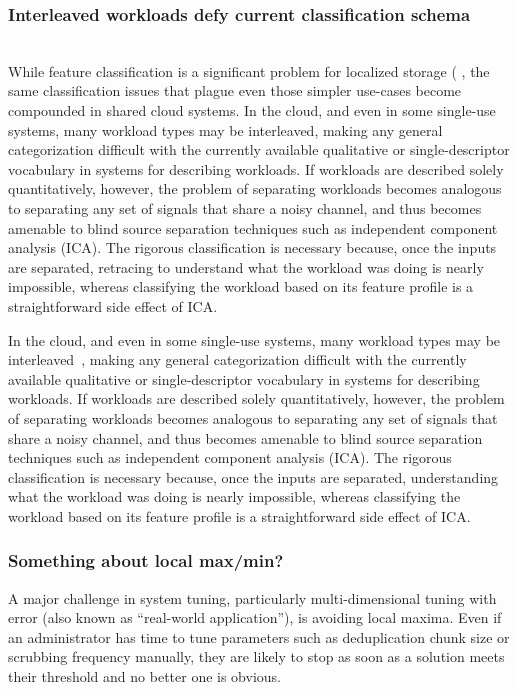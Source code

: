 \subsubsection*{Interleaved workloads defy current classification schema}\\
While feature classification is a significant problem for localized storage (%
, the
same classification issues that plague even those simpler use-cases become
compounded in shared cloud systems. In the cloud, and even in some single-use systems, many workload types may be interleaved, making any general
categorization difficult with the currently available qualitative or
single-descriptor vocabulary in systems for describing workloads.  If workloads
are described solely quantitatively, however, the problem of separating
workloads becomes analogous to separating any set of signals that share a noisy
channel, and thus becomes amenable to blind source separation techniques such as
independent component analysis (ICA).  The rigorous classification is necessary
because, once the inputs are separated, retracing to understand what the
workload was doing is nearly impossible, whereas classifying the workload based
on its feature profile is a straightforward side effect of ICA.  

In the cloud, and even in some single-use systems, many workload types may be
interleaved~\cite{TK}, making any general categorization difficult with the
currently available qualitative or single-descriptor vocabulary in systems for
describing workloads. If workloads are described solely quantitatively, however,
the problem of separating workloads becomes analogous to separating any set of
signals that share a noisy channel, and thus becomes amenable to blind source
separation techniques such as independent component analysis (ICA). The rigorous
classification is necessary because, once the inputs are separated,
understanding what the workload was doing is nearly impossible, whereas
classifying the workload based on its feature profile is a straightforward side
effect of ICA.\\
\subsubsection*{Something about local max/min?}
A major challenge in system tuning, particularly multi-dimensional tuning with
error (also known as ``real-world application''), is avoiding local maxima.
Even if an administrator has time to tune parameters such as deduplication chunk
size or scrubbing frequency manually, they are likely to stop as soon as a
solution meets their threshold and no better one is obvious.%

